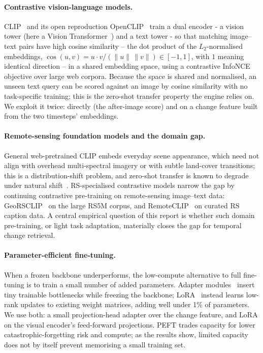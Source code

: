 \documentclass{article}
\begin{document}
\paragraph{Contrastive vision-language models.}
CLIP~\cite{clip} and its open reproduction OpenCLIP~\cite{openclip} train a dual
encoder - a vision tower (here a Vision Transformer~\cite{vit}) and a text
tower - so that matching image--text pairs have high cosine similarity -- the dot
product of the $L_2$-normalised embeddings, $\cos(u,v)=u\cdot v/(\lVert u\rVert\,
\lVert v\rVert)\in[-1,1]$, with $1$ meaning identical direction -- in a shared
embedding space, using a contrastive InfoNCE~\cite{infonce} objective over large
web corpora. Because the space is
shared and normalised, an unseen text query can be scored against an image by
cosine similarity with no task-specific training; this is the zero-shot transfer
property the engine relies on. We exploit it twice: directly (the after-image
score) and on a change feature built from the two timesteps' embeddings.

\paragraph{Remote-sensing foundation models and the domain gap.}
General web-pretrained CLIP embeds everyday scene appearance, which need not
align with overhead multi-spectral imagery or with subtle land-cover
transitions; this is a distribution-shift problem, and zero-shot transfer is
known to degrade under natural shift~\cite{distshift}. RS-specialised
contrastive models narrow the gap by continuing contrastive pre-training on
remote-sensing image--text data: GeoRSCLIP~\cite{georsclip} on the large RS5M
corpus, and RemoteCLIP~\cite{remoteclip} on curated RS caption data. A central
empirical question of this report is whether such domain pre-training, or
light task adaptation, materially closes the gap for temporal change retrieval.

\paragraph{Parameter-efficient fine-tuning.}
When a frozen backbone underperforms, the low-compute alternative to full
fine-tuning is to train a small number of added parameters. Adapter
modules~\cite{peftadapters} insert tiny trainable bottlenecks while freezing the
backbone; LoRA~\cite{lora} instead learns low-rank updates to existing weight
matrices, adding well under 1\% of parameters. We use both: a small
projection-head adapter over the change feature, and LoRA on the visual
encoder's feed-forward projections. PEFT trades capacity for lower
catastrophic-forgetting risk and compute; as the results show, limited capacity
does not by itself prevent memorising a small training set.
\end{document}

